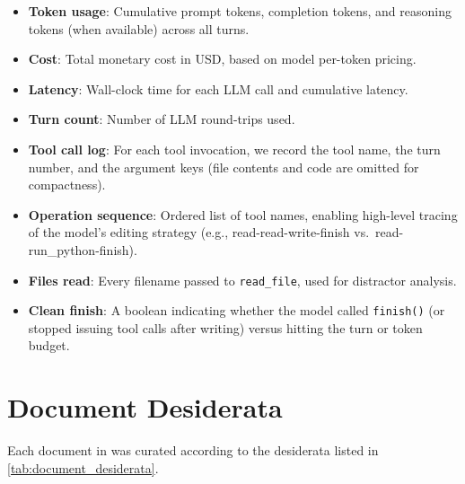 \documentclass{article} %
\begin{document}
\begin{itemize}
    \item \textbf{Token usage}: Cumulative prompt tokens, completion tokens, and reasoning tokens (when available) across all turns.
    \item \textbf{Cost}: Total monetary cost in USD, based on model per-token pricing.
    \item \textbf{Latency}: Wall-clock time for each LLM call and cumulative latency.
    \item \textbf{Turn count}: Number of LLM round-trips used.
    \item \textbf{Tool call log}: For each tool invocation, we record the tool name, the turn number, and the argument keys (file contents and code are omitted for compactness).
    \item \textbf{Operation sequence}: Ordered list of tool names, enabling high-level tracing of the model's editing strategy (e.g., read-read-write-finish vs.\ read-run\_python-finish).
    \item \textbf{Files read}: Every filename passed to \texttt{read\_file}, used for distractor analysis.
    \item \textbf{Clean finish}: A boolean indicating whether the model called \texttt{finish()} (or stopped issuing tool calls after writing) versus hitting the turn or token budget.
\end{itemize}


\section{Document Desiderata} \label{app:document_desiderata}

Each document in \benchmark{} was curated according to the desiderata listed in \autoref{tab:document_desiderata}.

\begin{table}[h!]

\caption{Desiderata guiding the curation of documents in \benchmark{}.}
\label{tab:document_desiderata}
\end{table}
\end{document}

